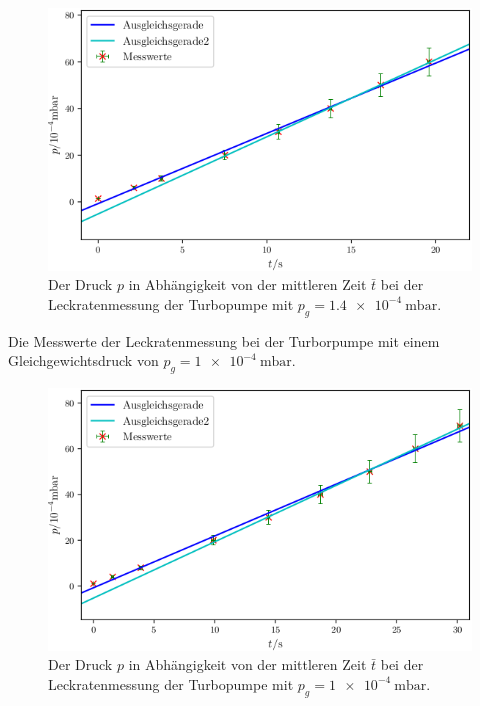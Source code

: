 \begin{figure}
\centering
\includegraphics[width=\linewidth-70pt,height=\textheight-70pt,keepaspectratio]{content/images/TL2.png}
\caption{Der Druck $p$ in Abhängigkeit von der mittleren Zeit $\bar{t}$ bei der Leckratenmessung der Turbopumpe  mit $p_g = \SI{1.4e-4}{\milli\bar}$.}
\label{fig:TL2}
\end{figure}

\begin{table}
\centering
\caption{Die Messwerte der Leckratenmessung bei der Turborpumpe mit einem Gleichgewichtsdruck von $p_g = \SI{1e-4}{\milli\bar}$.}

\label{tab:TL3}
\end{table}

\begin{figure}
\centering
\includegraphics[width=\linewidth-70pt,height=\textheight-70pt,keepaspectratio]{content/images/TL3.png}
\caption{Der Druck $p$ in Abhängigkeit von der mittleren Zeit $\bar{t}$ bei der Leckratenmessung der Turbopumpe  mit $p_g = \SI{1e-4}{\milli\bar}$.}
\label{fig:TL3}
\end{figure}

